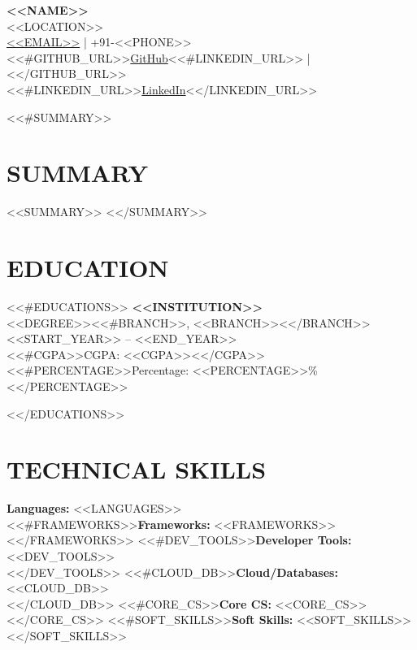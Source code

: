 \documentclass[a4paper,11pt]{article}
\begin{document}
\begin{center}
    {\LARGE \textbf{<<NAME>>}} \\[6pt]
    <<LOCATION>> \\[2pt]
    \href{mailto:<<EMAIL>>}{<<EMAIL>>} \;|\;
    +91-<<PHONE>> \\[2pt]
    <<#GITHUB_URL>>\href{<<GITHUB_URL>>}{GitHub}<<#LINKEDIN_URL>> \;|\; <</GITHUB_URL>><<#LINKEDIN_URL>>\href{<<LINKEDIN_URL>>}{LinkedIn}<</LINKEDIN_URL>>
\end{center}

\vspace{4pt}

<<#SUMMARY>>
\section*{SUMMARY}
<<SUMMARY>>
\vspace{2pt}
<</SUMMARY>>

\section*{EDUCATION}
<<#EDUCATIONS>>
\textbf{<<INSTITUTION>>} \\
<<DEGREE>><<#BRANCH>>, <<BRANCH>><</BRANCH>> \hfill <<START_YEAR>> -- <<END_YEAR>> \\
<<#CGPA>>CGPA: <<CGPA>><</CGPA>><<#PERCENTAGE>>Percentage: <<PERCENTAGE>>\%<</PERCENTAGE>>

<</EDUCATIONS>>
\vspace{-2mm}

\section*{TECHNICAL SKILLS}
\textbf{Languages:} <<LANGUAGES>> \\
<<#FRAMEWORKS>>\textbf{Frameworks:} <<FRAMEWORKS>> \\<</FRAMEWORKS>>
<<#DEV_TOOLS>>\textbf{Developer Tools:} <<DEV_TOOLS>> \\<</DEV_TOOLS>>
<<#CLOUD_DB>>\textbf{Cloud/Databases:} <<CLOUD_DB>> \\<</CLOUD_DB>>
<<#CORE_CS>>\textbf{Core CS:} <<CORE_CS>> \\<</CORE_CS>>
<<#SOFT_SKILLS>>\textbf{Soft Skills:} <<SOFT_SKILLS>><</SOFT_SKILLS>>

\vspace{2pt}
\end{document}
